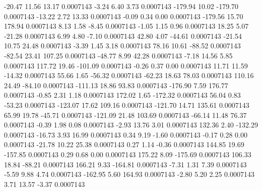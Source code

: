       -20.47       11.56       13.17     0.0007143
       -3.24        6.40        3.73     0.0007143
     -179.94       10.02     -179.70     0.0007143
      -13.22        2.72       13.33     0.0007143
       -0.09        0.34        0.00     0.0007143
     -179.56       15.70      178.94     0.0007143
        8.13        1.58       -8.45     0.0007143
       -1.05        1.15        0.96     0.0007143
       18.25        5.07      -21.28     0.0007143
        6.99        4.80       -7.10     0.0007143
       42.80        4.07      -44.61     0.0007143
      -21.54       10.75       24.48     0.0007143
       -3.39        1.45        3.18     0.0007143
       78.16       10.61      -88.52     0.0007143
      -82.54       23.41      107.25     0.0007143
      -48.77        8.99       42.28     0.0007143
       -7.18       14.56        5.85     0.0007143
      117.72       19.46     -101.09     0.0007143
       -0.26        0.37        0.00     0.0007143
       11.71       11.59      -14.32     0.0007143
       55.66        1.65      -56.32     0.0007143
      -62.23       18.63       78.03     0.0007143
      110.16       24.49      -84.10     0.0007143
     -111.13       18.86       93.83     0.0007143
     -176.90        7.59      176.77     0.0007143
       -0.85        2.31        1.18     0.0007143
      172.02        1.65     -172.32     0.0007143
       56.04        0.83      -53.23     0.0007143
     -123.07       17.62      109.16     0.0007143
     -121.70       14.71      135.61     0.0007143
       65.99       19.78      -45.71     0.0007143
     -121.09       21.48      103.69     0.0007143
      -66.14       11.48       76.37     0.0007143
       -0.39        1.98        0.08     0.0007143
       -2.93       13.76        3.01     0.0007143
      132.36        2.40     -132.29     0.0007143
      -16.73        3.93       16.99     0.0007143
        0.34        9.19       -1.60     0.0007143
       -0.17        0.28        0.00     0.0007143
      -21.78       10.22       25.38     0.0007143
        0.27        1.14       -0.36     0.0007143
      144.85       19.69     -157.85     0.0007143
        0.29        0.68        0.00     0.0007143
      175.22        8.09     -175.69     0.0007143
      106.33       18.84      -88.21     0.0007143
      166.21        9.33     -164.81     0.0007143
       -7.31        1.31        7.39     0.0007143
       -5.59        9.88        4.74     0.0007143
     -162.95        5.60      164.93     0.0007143
       -2.80        5.20        2.25     0.0007143
        3.71       13.57       -3.37     0.0007143
